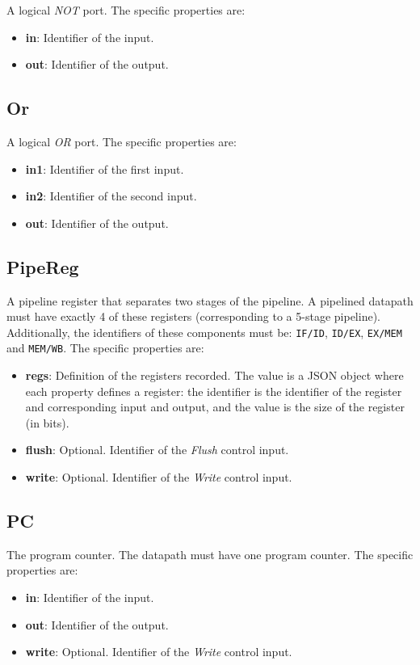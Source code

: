 \documentclass[11pt,a4paper,twoside,titlepage]{report}
\begin{document}
A logical \emph{NOT} port. The specific properties are:
\begin{itemize}
	\item \textbf{in}: Identifier of the input.
	\item \textbf{out}: Identifier of the output.
\end{itemize}

\subsection{Or}

A logical \emph{OR} port. The specific properties are:
\begin{itemize}
	\item \textbf{in1}: Identifier of the first input.
	\item \textbf{in2}: Identifier of the second input.
	\item \textbf{out}: Identifier of the output.
\end{itemize}

\subsection{PipeReg}

A pipeline register that separates two stages of the pipeline.
A pipelined datapath must have exactly 4 of these registers (corresponding to a
5-stage pipeline). Additionally, the identifiers of these components must be:
\verb+IF/ID+, \verb+ID/EX+, \verb+EX/MEM+ and \verb+MEM/WB+.
The specific properties are:
\begin{itemize}
	\item \textbf{regs}: Definition of the registers recorded. The value is a
		JSON object where each property defines a register: the identifier is
		the identifier of the register and corresponding input and output, and
		the value is the size of the register (in bits).
	\item \textbf{flush}: Optional. Identifier of the \emph{Flush} control input.
	\item \textbf{write}: Optional. Identifier of the \emph{Write} control input.
\end{itemize}

\subsection{PC}

The program counter. The datapath must have one program counter.
The specific properties are:
\begin{itemize}
	\item \textbf{in}: Identifier of the input.
	\item \textbf{out}: Identifier of the output.
	\item \textbf{write}: Optional. Identifier of the \emph{Write} control input.
\end{itemize}
\end{document}
